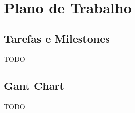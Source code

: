 
%
\   
\chapter{Plano de Trabalho}
\label{cha:work_plan}

\glsresetall

\section{Tarefas e Milestones}
\label{sec:tasks_milestones}

TODO

\section{Gant Chart}
\label{sec:gant_chart}

TODO
